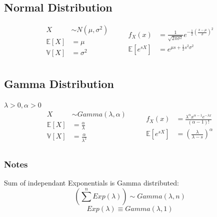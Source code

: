 \documentclass[12pt]{article}
\begin{document}
\subsection{Normal Distribution}
\begin{equation*}
    \begin{aligned}
        X &\sim N(\mu, \sigma^2) \qquad\\
        \mathbb{E}[X] &= \mu \\
        \mathbb{V}[X] &= \sigma^2 \\
    \end{aligned}
    \begin{aligned}
        f_X(x) &= \frac{1}{\sqrt{2\pi\sigma^2}} e^{-\frac{1}{2}\left(\frac{x - \mu}{\sigma}\right)^2} \\
        \mathbb{E}[e^{sX}] &= e^{\mu s + \frac{1}{2}s^2\sigma^2} \\
    \end{aligned}
\end{equation*}

\subsection{Gamma Distribution}
\(\lambda > 0, \alpha > 0 \)
\begin{equation*}
    \begin{aligned}
        X &\sim Gamma(\lambda, \alpha) \qquad\\
        \mathbb{E}[X] &= \frac{\alpha}{\lambda} \\
        \mathbb{V}[X] &= \frac{\alpha}{\lambda^2} \\
    \end{aligned}
    \begin{aligned}
        f_X(x) &= \frac{\lambda^\alpha x^{\alpha - 1} e^{-\lambda x}}{(\alpha - 1)!} \\
        \mathbb{E}[e^{sX}] &= \left(\frac{\lambda}{\lambda - s}\right)^\alpha \\
    \end{aligned}
\end{equation*}

\subsubsection{Notes}
Sum of independant Exponentials is Gamma distributed:
\begin{equation*}
    \left(\sum^{n} Exp(\lambda) \right) \sim Gamma(\lambda, n) 
\end{equation*}
\begin{equation*}
    Exp(\lambda) \equiv Gamma(\lambda, 1) 
\end{equation*}
\end{document}
